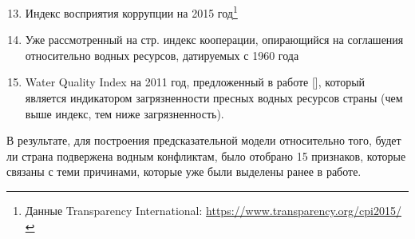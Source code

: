 \documentclass[a4paper, 12pt]{article}
\theoremstyle{plain} %
\theoremstyle{definition} %
\theoremstyle{remark} %
\begin{document}
\begin{enumerate}
	\setcounter{enumi}{12}
	\item Индекс восприятия коррупции на 2015 год\footnote{Данные Transparency International: \url{https://www.transparency.org/cpi2015/}}
	\item Уже рассмотренный на стр. \pageref{eq:1} индекс кооперации, 
	опирающийся на соглашения относительно водных ресурсов, датируемых с 1960 года
	\item Water Quality Index на 2011 год, предложенный в работе [\cite{srebotnjak}], который является индикатором загрязненности пресных водных ресурсов страны (чем выше индекс, тем ниже загрязненность).
\end{enumerate}
В результате, для построения предсказательной модели относительно того, будет ли страна подвержена водным конфликтам, было отобрано 15 признаков, которые связаны с теми причинами, которые уже были выделены ранее в работе.
\end{document}
